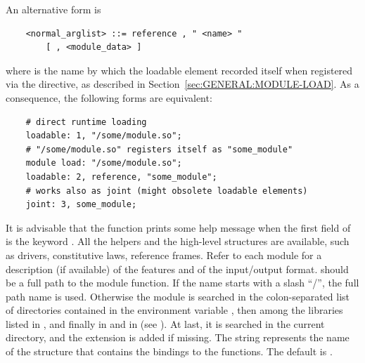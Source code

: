 An alternative form is
\begin{verbatim}
    <normal_arglist> ::= reference , " <name> "
        [ , <module_data> ]
\end{verbatim}
where  is the name by which the loadable element recorded itself
when registered via the  directive, as described
in Section~\ref{sec:GENERAL:MODULE-LOAD}.
As a consequence, the following forms are equivalent:
\begin{verbatim}
    # direct runtime loading
    loadable: 1, "/some/module.so";
    # "/some/module.so" registers itself as "some_module"
    module load: "/some/module.so";
    loadable: 2, reference, "some_module";
    # works also as joint (might obsolete loadable elements)
    joint: 3, some_module;
\end{verbatim}

It is advisable that the function  prints some help message
when the first field of  is the keyword .
All the helpers and the high-level structures are available, such as
drivers, constitutive laws, reference frames.
Refer to each module for a description (if available) of the features and of
the input/output format.
 should be a full path to the module function.
If the name starts with a slash ``/'', the full path name is used.
Otherwise the module is searched in the colon-separated list of directories 
contained in the environment variable , then among the
libraries listed in , and finally in
 and in  (see ).
At last, it is searched in the current directory, and the extension
 is added if missing.
The string  represents the name of the structure that contains
the bindings to the functions.
The default is .

